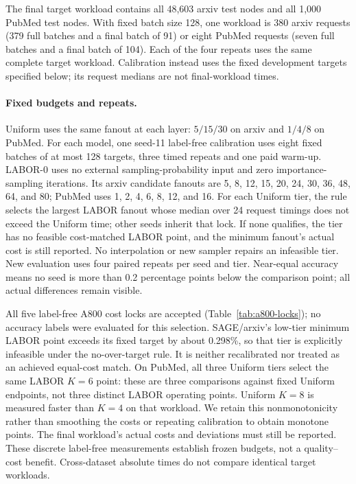The final target workload contains all 48,603 arxiv test nodes and all 1,000 PubMed test nodes. With fixed batch size 128, one workload is 380 arxiv requests (379 full batches and a final batch of 91) or eight PubMed requests (seven full batches and a final batch of 104). Each of the four repeats uses the same complete target workload. Calibration instead uses the fixed development targets specified below; its request medians are not final-workload times.

\paragraph{Fixed budgets and repeats.}
Uniform uses the same fanout at each layer: $5/15/30$ on arxiv and $1/4/8$ on PubMed. For each model, one seed-11 label-free calibration uses eight fixed batches of at most 128 targets, three timed repeats and one paid warm-up. LABOR-0 uses no external sampling-probability input and zero importance-sampling iterations. Its arxiv candidate fanouts are 5, 8, 12, 15, 20, 24, 30, 36, 48, 64, and 80; PubMed uses 1, 2, 4, 6, 8, 12, and 16. For each Uniform tier, the rule selects the largest LABOR fanout whose median over 24 request timings does not exceed the Uniform time; other seeds inherit that lock. If none qualifies, the tier has no feasible cost-matched LABOR point, and the minimum fanout's actual cost is still reported. No interpolation or new sampler repairs an infeasible tier. New evaluation uses four paired repeats per seed and tier. Near-equal accuracy means no seed is more than 0.2 percentage points below the comparison point; all actual differences remain visible.

All five label-free A800 cost locks are accepted (Table~\ref{tab:a800-locks}); no accuracy labels were evaluated for this selection. SAGE/arxiv's low-tier minimum LABOR point exceeds its fixed target by about 0.298\%, so that tier is explicitly infeasible under the no-over-target rule. It is neither recalibrated nor treated as an achieved equal-cost match. On PubMed, all three Uniform tiers select the same LABOR $K=6$ point: these are three comparisons against fixed Uniform endpoints, not three distinct LABOR operating points. Uniform $K=8$ is measured faster than $K=4$ on that workload. We retain this nonmonotonicity rather than smoothing the costs or repeating calibration to obtain monotone points. The final workload's actual costs and deviations must still be reported. These discrete label-free measurements establish frozen budgets, not a quality--cost benefit. Cross-dataset absolute times do not compare identical target workloads.

